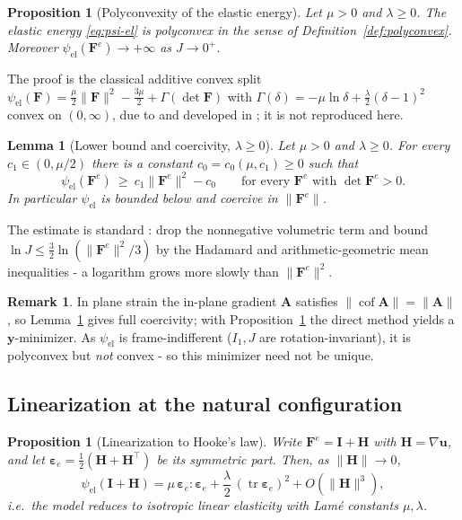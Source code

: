 \documentclass[12pt]{article}
\theoremstyle{plain}
\newtheorem{proposition}[theorem]{Proposition}
\newtheorem{lemma}[theorem]{Lemma}
\theoremstyle{definition}
\newtheorem{remark}[theorem]{Remark}
\newcommand{\bF}{\bm{F}}
\newcommand{\bu}{\bm{u}}
\newcommand{\by}{\bm{y}}
\newcommand{\bI}{\bm{I}}
\newcommand{\Fe}{\bF^{e}}
\newcommand{\tr}{\operatorname{tr}}
\newcommand{\cof}{\operatorname{cof}}
\begin{document}
\begin{proposition}[Polyconvexity of the elastic energy]\label{prop:polyconvex}
Let $\mu>0$ and $\lambda\ge0$. The elastic energy \eqref{eq:psi-el}
is polyconvex in the sense of Definition~\ref{def:polyconvex}. Moreover
$\psi_{\mathrm{el}}(\Fe)\to+\infty$ as $J\to0^{+}$.
\end{proposition}

\noindent The proof is the classical additive convex split
$\psi_{\mathrm{el}}(\bF)=\tfrac{\mu}{2}\|\bF\|^{2}-\tfrac{3\mu}{2}
+\Gamma(\det\bF)$ with
$\Gamma(\delta)=-\mu\ln\delta+\tfrac{\lambda}{2}(\delta-1)^{2}$ convex on
$(0,\infty)$, due to \citet{ciarlet1982lois} and developed in
\citet{ciarlet1988mathematical}; it is not reproduced here. 

\begin{lemma}[Lower bound and coercivity, $\lambda\ge0$]\label{lem:coercive}
Let $\mu>0$ and $\lambda\ge0$. For every $c_1\in(0,\mu/2)$ there is a constant
$c_0=c_0(\mu,c_1)\ge0$ such that
\begin{equation}\label{eq:coercive}
  \psi_{\mathrm{el}}(\Fe)\ \ge\ c_1\|\Fe\|^{2}-c_0
  \qquad\text{for every }\Fe\text{ with }\det\Fe>0 .
\end{equation}
In particular $\psi_{\mathrm{el}}$ is bounded below and coercive in $\|\Fe\|$.
\end{lemma}

\noindent The estimate is standard \citep{ciarlet1988mathematical}: drop the nonnegative
volumetric term and bound $\ln J\le\tfrac32\ln(\|\Fe\|^{2}/3)$ by the Hadamard
and arithmetic-geometric mean inequalities - a logarithm grows more slowly than
$\|\Fe\|^{2}$. 

\begin{remark}\label{rem:notconvex}
In plane strain the in-plane gradient $\bm{A}$ satisfies
$\|\cof\bm{A}\|=\|\bm{A}\|$, so Lemma~\ref{lem:coercive} gives full coercivity;
with Proposition~\ref{prop:polyconvex} the direct method \citep{ball1976convexity}
yields a $\by$-minimizer. As $\psi_{\mathrm{el}}$ is frame-indifferent
($I_1,J$ are rotation-invariant), it is polyconvex but \emph{not} convex - so
this minimizer need not be unique.
\end{remark}

\subsection{Linearization at the natural configuration}\label{sec:linear}

\begin{proposition}[Linearization to Hooke's law]\label{prop:linear}
Write $\Fe=\bI+\bm{H}$ with $\bm{H}=\nabla\bu$, and let
$\bm{\varepsilon}_e=\tfrac12(\bm{H}+\bm{H}^{\!\top})$ be its symmetric part.
Then, as $\|\bm{H}\|\to0$,
\begin{equation}\label{eq:hooke-limit}
  \psi_{\mathrm{el}}(\bI+\bm{H})=\mu\,\bm{\varepsilon}_e\!:\!\bm{\varepsilon}_e
  +\frac{\lambda}{2}\,(\tr\bm{\varepsilon}_e)^{2}+O(\|\bm{H}\|^{3}),
\end{equation}
i.e.\ the model reduces to isotropic linear elasticity with Lam\'e constants
$\mu,\lambda$.
\end{proposition}
\end{document}
